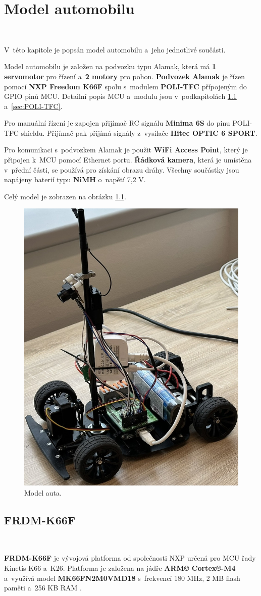 \chapter{Model automobilu}
\label{sec:CarModel}\

V~této kapitole je popsán model automobilu a~jeho jednotlivé součásti.

Model automobilu je založen na podvozku typu Alamak, která má \textbf{1 servomotor}
pro řízení a~\textbf{2 motory} pro pohon. \textbf{Podvozek Alamak} je řízen pomocí 
\textbf{NXP Freedom K66F} spolu s~modulem \textbf{POLI-TFC} 
přípojeným do GPIO pinů MCU. Detailní popis MCU a~modulu jsou v~podkapitolách 
\ref{sec:FRDM-K66F} a~\ref{sec:POLI-TFC}.

Pro manuální řízení je zapojen přijímač RC signálu \textbf{Minima 6S} do pinu
POLI-TFC shieldu. Přijímač pak přijímá signály z~vysílače \textbf{Hitec OPTIC 6 
SPORT}.

Pro komunikaci s~podvozkem Alamak je použit \textbf{WiFi Access Point}, který je
připojen k~MCU pomocí Ethernet portu. \textbf{Řádková kamera}, která je umístěna
v~přední části, se používá pro získání obrazu dráhy. Všechny součástky
jsou napájeny baterií typu \textbf{NiMH} o~napětí 7,2 V.

Celý model je zobrazen na obrázku \ref{fig:car}.
\begin{figure}[!h]
    \centering
    \includegraphics[width = .4\linewidth]{Figures/Car.jpeg}
    \caption{Model auta.}
    \label{fig:car}
\end{figure}

\section{FRDM-K66F}
\label{sec:FRDM-K66F}\

\textbf{FRDM-K66F} je vývojová platforma od společnosti NXP určená pro MCU řady 
Kinetis K66 a~K26. Platforma je založena na jádře \textbf{ARM© Cortex®-M4}
a~využívá model \textbf{MK66FN2M0VMD18} s~frekvencí 180 MHz, 2 MB flash paměti
a~256 KB RAM \cite{frdmk66UserGuide}.

